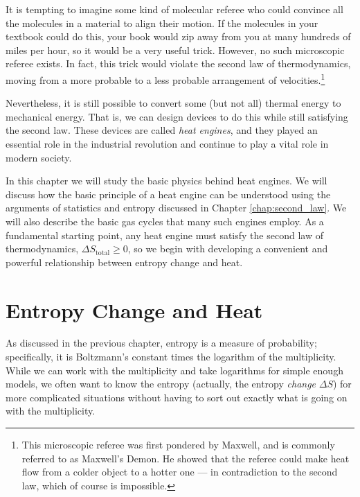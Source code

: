 It is tempting to imagine some kind of molecular referee who could
convince all the molecules in a material to align their motion.
If the molecules in your textbook could do this, your book would zip
away from you at many hundreds of miles per hour, so it would be a
very useful trick.  However, no such microscopic referee exists.  In
fact, this trick would violate the second law of thermodynamics,
moving from a more probable to a less probable arrangement of
velocities.\footnote{This microscopic referee was first pondered by
  Maxwell, and is commonly referred to as Maxwell's Demon.  He showed
  that the referee could make heat flow from a colder object to a
  hotter one --- in contradiction to the second law, which of course
  is impossible.}

Nevertheless, it is still possible to convert some (but not all)
thermal energy to mechanical energy.  That is, we can design devices
to do this while still satisfying the second law.  These devices are
called \textit{heat engines}, and they played an essential role in the
industrial revolution and continue to play a vital role in modern
society.

In this chapter we will study the basic physics behind heat engines.
We will discuss how the basic principle of a heat engine can be
understood using the arguments of statistics and entropy discussed in
Chapter \ref{chap:second_law}.  We will also describe the basic gas
cycles that many such engines employ.  As a fundamental starting
point, any heat engine must satisfy the second law of thermodynamics,
$\Delta S_\text{total} \ge 0$, so we begin with developing a
convenient and powerful relationship between entropy change and heat.

\section{Entropy Change and Heat}

As discussed in the previous chapter, entropy is a measure of
probability; specifically, it is Boltzmann's constant times the
logarithm of the multiplicity.  While we can work with the
multiplicity and take logarithms for simple enough models, we often
want to know the entropy (actually, the entropy \textit{change} $\Delta
S$) for more complicated situations without having to sort out exactly
what is going on with the multiplicity.

